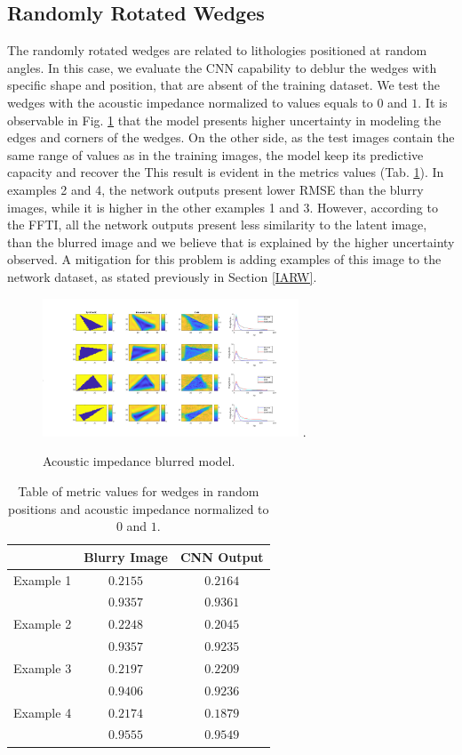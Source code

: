 \documentclass[conference,compsoc]{IEEEtran}
\begin{document}
\subsection{Randomly Rotated Wedges}
The randomly rotated wedges are related to lithologies positioned at random angles.
In this case, we evaluate the CNN capability to deblur the wedges with specific shape and
position, that are absent of the training dataset.
We test the wedges with the acoustic impedance normalized to values equals to $0$ and $1$.
It is observable in Fig. \ref{fig_scenario4} that the model presents higher uncertainty
in modeling the edges and corners of the wedges. On the other side, as the test images contain the same range of values
as in the training images, the model keep its predictive capacity and recover the  This result is evident in the metrics values
(Tab. \ref{table_caso_6}). In examples 2 and 4, the network outputs present lower RMSE than the blurry images, 
while it is higher in the other examples 1 and 3. However, according to the FFTI, all the network outputs present
less similarity to the latent image, than the blurred image and we believe that is explained by the higher uncertainty
observed. A mitigation for this problem is adding examples of this image to the network dataset, as stated previously in
Section \ref{IARW}.
\begin{figure}[!t]
\centering
\includegraphics[width=3.0in]{Figs/Caso4}
\DeclareGraphicsExtensions.
\caption{Acoustic impedance blurred model.}
\label{fig_scenario4}
\end{figure}

\begin{table}[!t]
\renewcommand{\arraystretch}{1.3}
\caption{Table of metric values for wedges in random positions and acoustic impedance normalized to $0$ and $1$.}
\label{table_caso_6}
\centering
\begin{tabular}{|c||c||c|}
\hline
 & Blurry Image & CNN Output \\
\hline
Example 1 & $0.2155$ & $0.2164$\\
\hline
	  & $0.9357$ & $0.9361$\\
\hline
Example 2 & $0.2248$ & $0.2045$ \\
\hline
	  & $0.9357$ & $0.9235$\\
\hline
Example 3 & $0.2197$ & $0.2209$\\
\hline
	  & $0.9406$ & $0.9236$\\
\hline
Example 4 & $0.2174$ & $0.1879$\\
\hline
	  & $0.9555$ & $0.9549$\\
\hline
\end{tabular}
\end{table}
\end{document}
